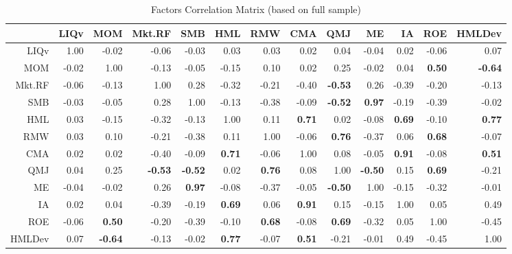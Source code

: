 \begin{sidewaystable}[ht]
	\centering
	\begin{tabular}{rrrrrrrrrrrrr}
		\hline
		& LIQv & MOM & Mkt.RF & SMB & HML & RMW & CMA & QMJ & ME & IA & ROE & HMLDev \\ 
		\hline
		LIQv & 1.00 & -0.02 & -0.06 & -0.03 & 0.03 & 0.03 & 0.02 & 0.04 & -0.04 & 0.02 & -0.06 & 0.07 \\ 
		MOM & -0.02 & 1.00 & -0.13 & -0.05 & -0.15 & 0.10 & 0.02 & 0.25 & -0.02 & 0.04 &\textbf{ 0.50} & \textbf{-0.64} \\ 
		Mkt.RF & -0.06 & -0.13 & 1.00 & 0.28 & -0.32 & -0.21 & -0.40 & \textbf{-0.53} & 0.26 & -0.39 & -0.20 & -0.13 \\ 
		SMB & -0.03 & -0.05 & 0.28 & 1.00 & -0.13 & -0.38 & -0.09 & \textbf{-0.52} & \textbf{0.97} & -0.19 & -0.39 & -0.02 \\ 
		HML & 0.03 & -0.15 & -0.32 & -0.13 & 1.00 & 0.11 & \textbf{0.71} & 0.02 & -0.08 & \textbf{0.69} & -0.10 & \textbf{0.77 }\\ 
		RMW & 0.03 & 0.10 & -0.21 & -0.38 & 0.11 & 1.00 & -0.06 & \textbf{0.76} & -0.37 & 0.06 & \textbf{0.68} & -0.07 \\ 
		CMA & 0.02 & 0.02 & -0.40 & -0.09 & \textbf{0.71} & -0.06 & 1.00 & 0.08 & -0.05 & \textbf{0.91} & -0.08 & \textbf{0.51} \\ 
		QMJ & 0.04 & 0.25 & \textbf{-0.53} & \textbf{-0.52} & 0.02 & \textbf{0.76} & 0.08 & 1.00 & \textbf{-0.50} & 0.15 & \textbf{0.69} & -0.21 \\ 
		ME & -0.04 & -0.02 & 0.26 & \textbf{0.97} & -0.08 & -0.37 & -0.05 & \textbf{-0.50} & 1.00 & -0.15 & -0.32 & -0.01 \\ 
		IA & 0.02 & 0.04 & -0.39 & -0.19 & \textbf{0.69} & 0.06 &\textbf{ 0.91} & 0.15 & -0.15 & 1.00 & 0.05 & 0.49 \\ 
		ROE & -0.06 & \textbf{0.50} & -0.20 & -0.39 & -0.10 & \textbf{0.68} & -0.08 & \textbf{0.69} & -0.32 & 0.05 & 1.00 & -0.45 \\ 
		HMLDev & 0.07 & \textbf{-0.64} & -0.13 & -0.02 & \textbf{0.77} & -0.07 & \textbf{0.51} & -0.21 & -0.01 & 0.49 & -0.45 & 1.00 \\ 
		\hline
	\end{tabular}
	\caption{Factors Correlation Matrix (based on full sample)}
\end{sidewaystable}

